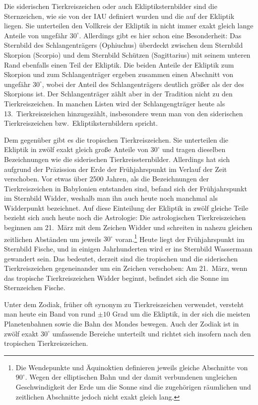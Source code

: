 Die siderischen Tierkreiszeichen oder auch Ekliptiksternbilder
sind die Sternzeichen, wie sie von der IAU definiert wurden und die auf der Ekliptik liegen. Sie unterteilen den
Vollkreis der Ekliptik in nicht immer exakt gleich lange Anteile von ungef\"ahr $30^\circ$. Allerdings gibt es hier schon 
eine Besonderheit: Das Sternbild des Schlangentr\"agers (Ophiuchus) \"uberdeckt zwischen dem Sternbild 
Skorpion (Scorpio) und dem Sternbild Sch\"utzen (Sagittarius) mit seinem unteren Rand ebenfalls einen 
Teil der Ekliptik. Die beiden Anteile der Ekliptik zum Skorpion und zum Schlangentr\"ager ergeben zusammen
einen Abschnitt von ungef\"ahr $30^\circ$, wobei der Anteil des Schlangentr\"agers deutlich gr\"o\ss er als der des
Skorpions ist. Der Schlangentr\"ager z\"ahlt aber in der Tradition nicht zu den Tierkreiszeichen. In manchen Listen
wird der Schlangengtr\"ager heute als 13.\ Tierkreiszeichen hinzugez\"ahlt, insbesondere wenn man von den
siderischen Tierkreiszeichen bzw.\ Ekliptiksternbildern spricht. 

Dem gegen\"uber gibt es die tropischen Tierkreiszeichen. Sie unterteilen die Ekliptik in zw\"olf exakt gleich gro\ss e
Anteile von $30^\circ$ und tragen dieselben Bezeichnungen wie die siderischen Tierkreissternbilder. 
Allerdings hat sich aufgrund der Pr\"azission der Erde der Fr\"uhjahrspunkt im Verlauf der Zeit verschoben. Vor etwas
\"uber 2500 Jahren, als die Bezeichnungen der Tierkreiszeichen in Babylonien entstanden sind, 
befand sich der Fr\"uhjahrspunkt im
Sternbild Widder, weshalb man ihn auch heute noch manchmal als Widderpunkt bezeichnet. Auf diese Einteilung
der Ekliptik in zw\"olf gleiche Teile bezieht sich auch heute noch die Astrologie: Die astrologischen Tierkreiszeichen 
beginnen am 21.\ M\"arz mit dem Zeichen Widder und schreiten in nahezu gleichen zeitlichen Abst\"anden um jeweils
$30^\circ$ voran.\footnote{Die Wendepunkte und \"Aquinoktien definieren jeweils gleiche Abschnitte von $90^\circ$.
Wegen der elliptischen Bahn und der damit verbundenen ungleichen Geschwindigkeit der Erde um die Sonne 
sind die zugeh\"origen r\"aumlichen und zeitlichen Abschnitte jedoch nicht
exakt gleich lang.} Heute liegt der Fr\"uhjahrspunkt im Sternbild Fische, und in einigen Jahrhunderten wird er
ins Sternbild Wassermann gewandert sein. Das bedeutet, derzeit sind die tropischen und die 
siderischen Tierkreiszeichen gegeneinander um ein Zeichen verschoben: Am 21.\ M\"arz, 
wenn das tropische Tierkreiszeichen Widder
beginnt, befindet sich die Sonne im Sternzeichen Fische.  

Unter dem Zodiak, 
fr\"uher oft synonym zu Tierkreiszeichen verwendet, versteht man heute ein Band von rund 
$\pm 10$ Grad um die Ekliptik, in der sich die meisten Planetenbahnen sowie die Bahn des Mondes bewegen. Auch 
der Zodiak ist in zw\"olf exakt $30^\circ$ umfassende Bereiche unterteilt und richtet sich insofern nach den
tropischen Tierkreiszeichen. 

